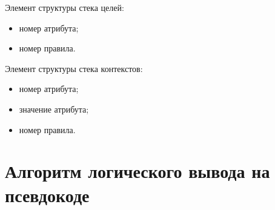 Элемент структуры стека целей:
\begin{itemize}
    \item номер атрибута;
    \item номер правила.
\end{itemize}

Элемент структуры стека контекстов:
\begin{itemize}
    \item номер атрибута;
    \item значение атрибута;
    \item номер правила.
\end{itemize}

\section{Алгоритм логического вывода на псевдокоде}

